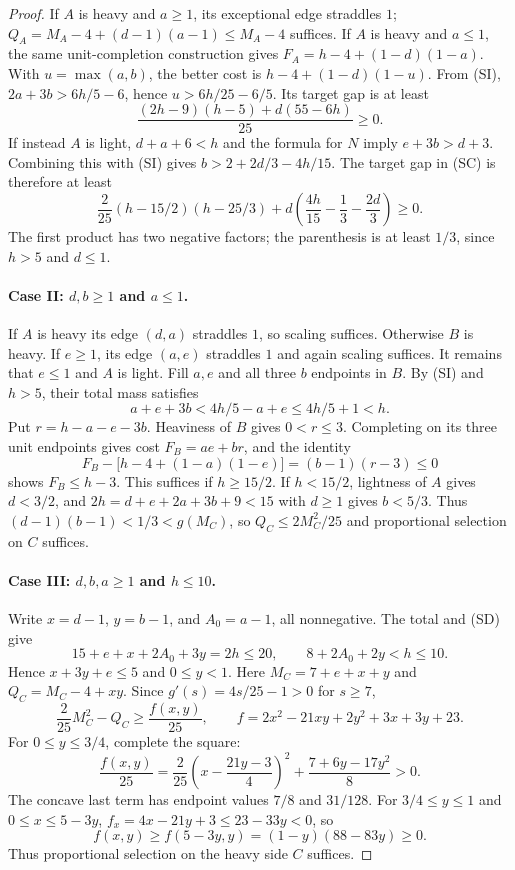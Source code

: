 \begin{proof}
If $A$ is heavy and $a\geq1$, its exceptional edge straddles $1$;
$Q_A=M_A-4+(d-1)(a-1)\leq M_A-4$ suffices.
If $A$ is heavy and $a\leq1$, the same unit-completion construction gives
$F_A=h-4+(1-d)(1-a)$. With $u=\max(a,b)$, the better cost is
$h-4+(1-d)(1-u)$. From (SI), $2a+3b>6h/5-6$, hence
$u>6h/25-6/5$. Its target gap is at least
\[
 \frac{(2h-9)(h-5)+d(55-6h)}{25}\geq0.
\]
If instead $A$ is light, $d+a+6<h$ and the formula for $N$ imply
$e+3b>d+3$. Combining this with (SI) gives
$b>2+2d/3-4h/15$. The target gap in (SC) is therefore at least
\[
 \frac2{25}(h-15/2)(h-25/3)
 +d\left(\frac{4h}{15}-\frac13-\frac{2d}{3}\right)\geq0.
\]
The first product has two negative factors; the parenthesis is at
least $1/3$, since $h>5$ and $d\leq1$.

\paragraph{Case II: $d,b\geq1$ and $a\leq1$.}
If $A$ is heavy its edge $(d,a)$ straddles $1$, so scaling suffices.
Otherwise $B$ is heavy. If $e\geq1$, its edge $(a,e)$ straddles $1$
and again scaling suffices.
It remains that $e\leq1$ and $A$ is light.
Fill $a,e$ and all three $b$ endpoints in $B$.
By (SI) and $h>5$, their total mass satisfies
\[
 a+e+3b<4h/5-a+e\leq4h/5+1<h.
\]
Put $r=h-a-e-3b$. Heaviness of $B$ gives $0<r\leq3$.
Completing on its three unit endpoints gives cost
$F_B=ae+br$, and the identity
\[
 F_B-\bigl[h-4+(1-a)(1-e)\bigr]=(b-1)(r-3)\leq0
\]
shows $F_B\leq h-3$. This suffices if $h\geq15/2$.
If $h<15/2$, lightness of $A$ gives $d<3/2$, and
$2h=d+e+2a+3b+9<15$ with $d\geq1$ gives $b<5/3$.
Thus $(d-1)(b-1)<1/3<g(M_C)$, so
$Q_C\leq2M_C^2/25$ and proportional selection on $C$ suffices.

\paragraph{Case III: $d,b,a\geq1$ and $h\leq10$.}
Write $x=d-1$, $y=b-1$, and $A_0=a-1$, all nonnegative.
The total and (SD) give
\[
 15+e+x+2A_0+3y=2h\leq20,\qquad
 8+2A_0+2y<h\leq10.
\]
Hence $x+3y+e\leq5$ and $0\leq y<1$.
Here $M_C=7+e+x+y$ and $Q_C=M_C-4+xy$.
Since $g'(s)=4s/25-1>0$ for $s\geq7$,
\[
 \frac2{25}M_C^2-Q_C
 \geq\frac{f(x,y)}{25},\qquad
 f=2x^2-21xy+2y^2+3x+3y+23.
\]
For $0\leq y\leq3/4$, complete the square:
\[
 \frac{f(x,y)}{25}
 =\frac2{25}\left(x-\frac{21y-3}{4}\right)^2
  +\frac{7+6y-17y^2}{8}>0.
\]
The concave last term has endpoint values $7/8$ and $31/128$.
For $3/4\leq y\leq1$ and $0\leq x\leq5-3y$,
$f_x=4x-21y+3\leq23-33y<0$, so
\[
 f(x,y)\geq f(5-3y,y)=(1-y)(88-83y)\geq0.
\]
Thus proportional selection on the heavy side $C$ suffices.


\end{proof}
